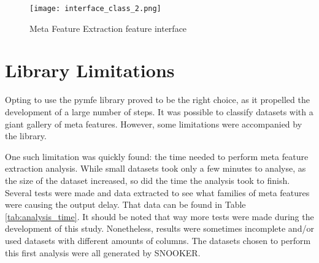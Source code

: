 \begin{figure}[!h]
  \begin{center}
    \leavevmode
    \texttt{[image: interface\_class\_2.png]}
    \caption{Meta Feature Extraction feature interface }
    \label{fig:class_interface_2}
  \end{center}
\end{figure}

\section{Library Limitations}
Opting to use the pymfe library proved to be the right choice, as it propelled the development of a large number of steps. It was possible to classify datasets with a giant gallery of meta features. However, some limitations were accompanied by the library. 

One such limitation was quickly found: the time needed to perform meta feature extraction analysis. While small datasets took only a few minutes to analyse, as the size of the dataset increased, so did the time the analysis took to finish. Several tests were made and data extracted to see what families of meta features were causing the output delay. That data can be found in Table \ref{tab:analysis_time}. It should be noted that way more tests were made during the development of this study. Nonetheless, results were sometimes incomplete and/or used datasets with different amounts of columns. The datasets chosen to perform this first analysis were all generated by SNOOKER.

